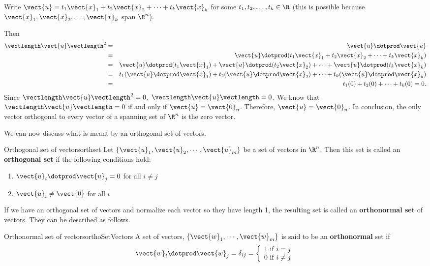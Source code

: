 \begin{solution}
Write $\vect{u}=t_1\vect{x}_1 + t_2\vect{x}_2 +\cdots +t_k\vect{x}_k$
for some $t_1, t_2, \ldots, t_k\in\R$
(this is possible because
$\vect{x}_1, \vect{x}_2, \ldots, \vect{x}_k$ span $\R^n$).
 
Then
\begin{eqnarray*}
\vectlength\vect{u}\vectlength^2 & = & \vect{u}\dotprod\vect{u} \\
& = & \vect{u}\dotprod(t_1\vect{x}_1 + t_2\vect{x}_2 +\cdots +t_k\vect{x}_k) \\
& = & \vect{u}\dotprod (t_1\vect{x}_1) +  \vect{u}\dotprod (t_2\vect{x}_2) +
\cdots +  \vect{u}\dotprod (t_k\vect{x}_k) \\
& = & t_1(\vect{u}\dotprod \vect{x}_1) + t_2(\vect{u}\dotprod \vect{x}_2) + \cdots 
+ t_k(\vect{u}\dotprod \vect{x}_k) \\
& = & t_1(0) + t_2(0) + \cdots + t_k(0) = 0.
\end{eqnarray*}
Since $\vectlength\vect{u}\vectlength^2 =0$, $\vectlength\vect{u}\vectlength =0$.
We know that $\vectlength\vect{u}\vectlength=0$ if and only if 
$\vect{u}=\vect{0}_n$.
Therefore, $\vect{u}=\vect{0}_n$.
In conclusion, the only vector orthogonal to every vector of
a spanning set of $\R^n$ is the zero vector.
\end{solution}

We can now discuss what is meant by an orthogonal set of vectors. 

\begin{definition}{Orthogonal set of vectors}{orthset}
Let $\{ \vect{u}_1, \vect{u}_2, \cdots, \vect{u}_m \}$ be a set of
vectors in $\R^n$. Then this set is called an
\textbf{orthogonal set}
if the following conditions hold:
\begin{enumerate}
\item 
$\vect{u}_i \dotprod \vect{u}_j = 0$ for all $i \neq j$ 
\item
$\vect{u}_i \neq \vect{0}$ for all $i$
\end{enumerate}
\end{definition}

If we have an orthogonal set of vectors and normalize each vector so
they have length 1, the resulting set is called an \textbf{orthonormal
set} of vectors. They can be described as follows.

\begin{definition}{Orthonormal set of vectors}{orthoSetVectors}
A set of vectors, $\left\{ \vect{w}_{1},\cdots ,\vect{w}_{m}\right\} $
is said to be an
\textbf{orthonormal}
set if 
\[
\vect{w}_i \dotprod \vect{w}_j = \delta _{ij} = \left\{ 
\begin{array}{c}
1\text{ if }i=j \\ 
0\text{ if }i\neq j
\end{array}
\right.
\]
\end{definition}

